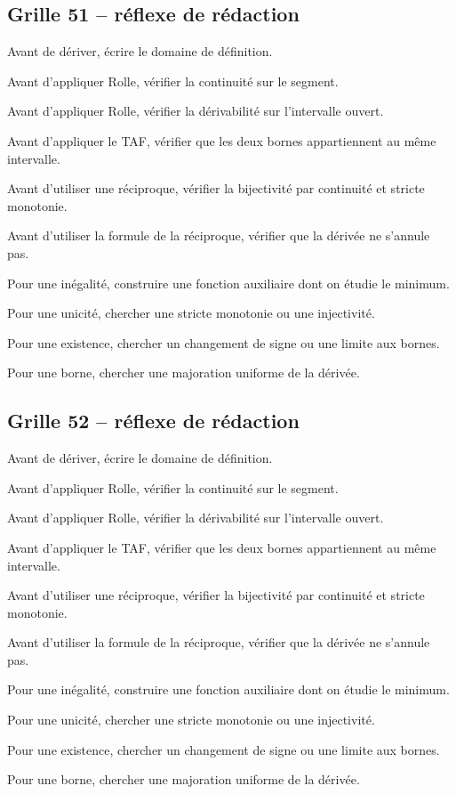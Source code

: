 \documentclass[11pt,a4paper]{article}
\begin{document}
\subsection*{Grille 51 -- réflexe de rédaction}

\begin{methodebox}

Avant de dériver, écrire le domaine de définition.

Avant d'appliquer Rolle, vérifier la continuité sur le segment.

Avant d'appliquer Rolle, vérifier la dérivabilité sur l'intervalle ouvert.

Avant d'appliquer le TAF, vérifier que les deux bornes appartiennent au même intervalle.

Avant d'utiliser une réciproque, vérifier la bijectivité par continuité et stricte monotonie.

Avant d'utiliser la formule de la réciproque, vérifier que la dérivée ne s'annule pas.

Pour une inégalité, construire une fonction auxiliaire dont on étudie le minimum.

Pour une unicité, chercher une stricte monotonie ou une injectivité.

Pour une existence, chercher un changement de signe ou une limite aux bornes.

Pour une borne, chercher une majoration uniforme de la dérivée.

\end{methodebox}

\subsection*{Grille 52 -- réflexe de rédaction}

\begin{methodebox}

Avant de dériver, écrire le domaine de définition.

Avant d'appliquer Rolle, vérifier la continuité sur le segment.

Avant d'appliquer Rolle, vérifier la dérivabilité sur l'intervalle ouvert.

Avant d'appliquer le TAF, vérifier que les deux bornes appartiennent au même intervalle.

Avant d'utiliser une réciproque, vérifier la bijectivité par continuité et stricte monotonie.

Avant d'utiliser la formule de la réciproque, vérifier que la dérivée ne s'annule pas.

Pour une inégalité, construire une fonction auxiliaire dont on étudie le minimum.

Pour une unicité, chercher une stricte monotonie ou une injectivité.

Pour une existence, chercher un changement de signe ou une limite aux bornes.

Pour une borne, chercher une majoration uniforme de la dérivée.

\end{methodebox}
\end{document}
